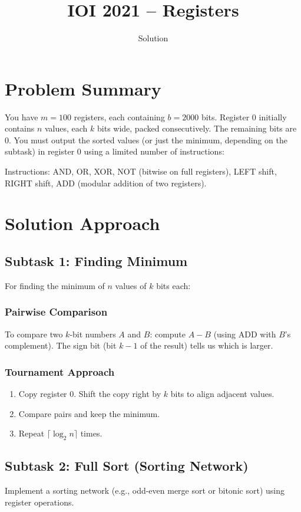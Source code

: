 \documentclass[11pt,a4paper]{article}
\title{IOI 2021 -- Registers}
\author{Solution}
\date{}
\begin{document}
\maketitle

\section{Problem Summary}
You have $m = 100$ registers, each containing $b = 2000$ bits. Register 0 initially contains $n$ values, each $k$ bits wide, packed consecutively. The remaining bits are 0. You must output the sorted values (or just the minimum, depending on the subtask) in register 0 using a limited number of instructions:

Instructions: AND, OR, XOR, NOT (bitwise on full registers), LEFT shift, RIGHT shift, ADD (modular addition of two registers).

\section{Solution Approach}

\subsection{Subtask 1: Finding Minimum}
For finding the minimum of $n$ values of $k$ bits each:

\subsubsection{Pairwise Comparison}
To compare two $k$-bit numbers $A$ and $B$: compute $A - B$ (using ADD with $B$'s complement). The sign bit (bit $k-1$ of the result) tells us which is larger.

\subsubsection{Tournament Approach}
\begin{enumerate}
  \item Copy register 0. Shift the copy right by $k$ bits to align adjacent values.
  \item Compare pairs and keep the minimum.
  \item Repeat $\lceil \log_2 n \rceil$ times.
\end{enumerate}

\subsection{Subtask 2: Full Sort (Sorting Network)}
Implement a sorting network (e.g., odd-even merge sort or bitonic sort) using register operations.
\end{document}
